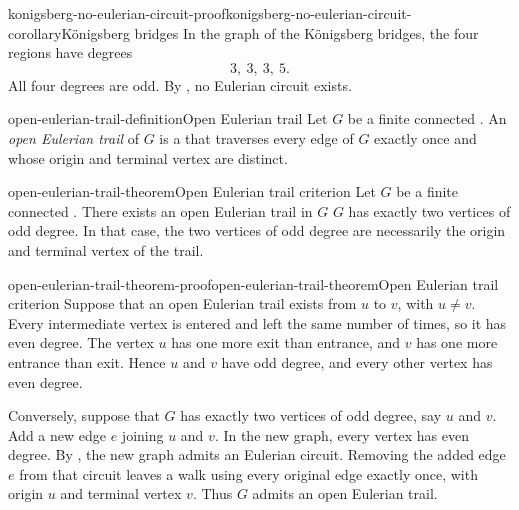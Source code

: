 \documentclass[preview]{standalone}
\begin{document}
\begin{snippetproof}{konigsberg-no-eulerian-circuit-proof}{konigsberg-no-eulerian-circuit-corollary}{Königsberg bridges}
    In the graph of the Königsberg bridges, the four regions have degrees
    \[
        3,\ 3,\ 3,\ 5.
    \]
    All four degrees are odd. By
    ,
    no Eulerian circuit exists.
\end{snippetproof}

\begin{snippetdefinition}{open-eulerian-trail-definition}{Open Eulerian trail}
    Let \(G\) be a finite connected \graph.
    An \emph{open Eulerian trail} of \(G\) is a \walk that traverses every edge
    of \(G\) exactly once and whose origin and terminal vertex are distinct.
\end{snippetdefinition}

\begin{snippettheorem}{open-eulerian-trail-theorem}{Open Eulerian trail criterion}
    Let \(G\) be a finite connected \graph.
    There exists an open Eulerian trail in \(G\) \ifandonlyif \(G\) has exactly
    two vertices of odd degree.
    In that case, the two vertices of odd degree are necessarily the origin and
    terminal vertex of the trail.
\end{snippettheorem}

\begin{snippetproof}{open-eulerian-trail-theorem-proof}{open-eulerian-trail-theorem}{Open Eulerian trail criterion}
    Suppose that an open Eulerian trail exists from \(u\) to \(v\), with
    \(u\neq v\). Every intermediate vertex is entered and left the same number
    of times, so it has even degree. The vertex \(u\) has one more exit than
    entrance, and \(v\) has one more entrance than exit. Hence \(u\) and \(v\)
    have odd degree, and every other vertex has even degree.

    Conversely, suppose that \(G\) has exactly two vertices of odd degree,
    say \(u\) and \(v\). Add a new edge \(e\) joining \(u\) and \(v\). In the
    new graph, every vertex has even degree. By
    ,
    the new graph admits an Eulerian circuit. Removing the added edge \(e\)
    from that circuit leaves a walk using every original edge exactly once,
    with origin \(u\) and terminal vertex \(v\). Thus \(G\) admits an open
    Eulerian trail.
\end{snippetproof}
\end{document}

